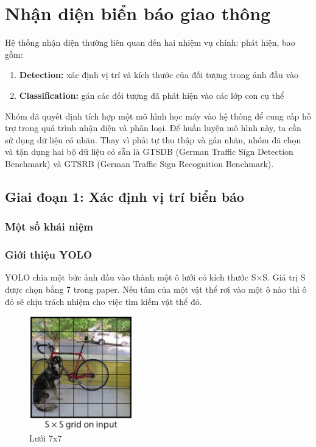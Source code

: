 \section{Nhận diện biển báo giao thông}
Hệ thống nhận diện thường liên quan đến hai nhiệm vụ chính: phát hiện, bao gồm:
\begin{enumerate}
    \item \textbf{Detection: }xác định vị trí và kích thước của đối tượng trong ảnh đầu vào
    \item \textbf{Classification: } gán các đối tượng đã phát hiện vào các lớp con cụ thể
\end{enumerate}
Nhóm đã quyết định tích hợp một mô hình học máy vào hệ thống để cung cấp hỗ trợ trong quá trình nhận diện và phân loại. Để huấn luyện mô hình này, ta cần sử dụng dữ liệu có nhãn. Thay vì phải tự thu thập và gán nhãn, nhóm đã chọn và tận dụng hai bộ dữ liệu có sẵn là GTSDB (German Traffic Sign Detection Benchmark) và GTSRB (German Traffic Sign Recognition Benchmark).


\subsection{Giai đoạn 1: Xác định vị trí biển báo}
\subsubsection{Một số khái niệm}

\subsubsection{Giới thiệu YOLO}
YOLO chia một bức ảnh đầu vào thành một ô lưới có kích thước S×S. Giá trị S được chọn bằng 7 trong paper. Nếu tâm của một vật thể rơi vào một ô nào thì ô đó sẽ chịu trách nhiệm cho việc tìm kiếm vật thể đó.

\begin{figure}[htp]
  \centering
  \includegraphics[width=0.4\textwidth]{images/2a-sign/grid1.png}
  \caption{Lưới 7x7}
\end{figure}

